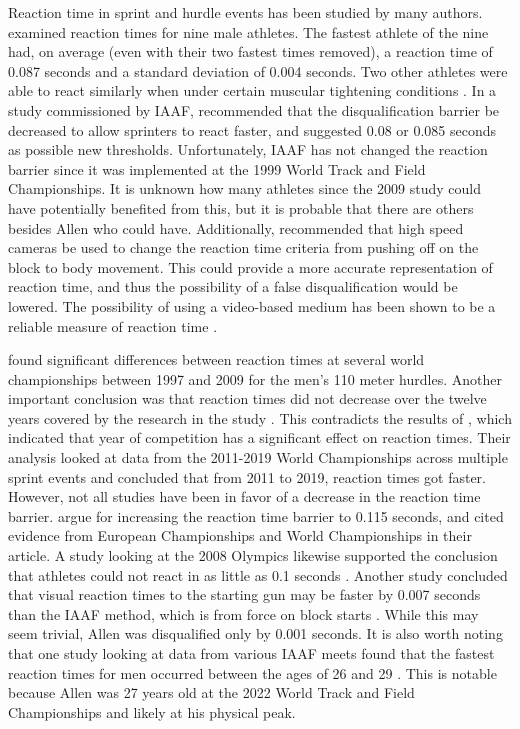 \documentclass[12pt, letterpaper, titlepage]{article}
\begin{document}
Reaction time in sprint and hurdle events has been studied by many authors.
\citet{pain2007sprint} examined reaction times for nine male athletes.  The
fastest athlete of the nine had, on average (even with their two fastest times 
removed), a reaction time of 0.087 seconds and a standard deviation of 0.004
seconds.  Two other athletes were able to react similarly when under certain
muscular tightening conditions \citep{pain2007sprint}. 
In a study commissioned by IAAF,
\citet{komi2009iaaf} recommended that the disqualification 
barrier be decreased to allow sprinters to
react faster, and suggested 0.08 or 0.085 seconds as possible new thresholds.
Unfortunately, IAAF has not changed the reaction barrier since it was
implemented at the 1999 World Track and Field Championships.
It is unknown how many athletes since the 2009 study could have potentially
benefited from this, but it is probable that there are others besides Allen who
could have. Additionally,
\citet{komi2009iaaf} recommended that high speed cameras be used to
change the reaction time criteria from pushing off on the block to body
movement. This could provide a more accurate representation of reaction time, 
and thus the possibility of a false disqualification would be lowered.
The possibility of using a video-based medium has been shown to be a reliable
measure of reaction time \citep{mudric2015evaluation}.


\citet{pilianidis2012start} found
significant differences between reaction times at several world championships
between 1997 and 2009 for the men's 110 meter hurdles.  Another important
conclusion was that reaction times did not decrease over the twelve years
covered by the research in the study \citep{pilianidis2012start}. This 
contradicts the results of \citet{zhang2021correlation}, which indicated that 
year of competition has a significant effect on reaction times.  Their
analysis looked at data from the 2011-2019 World Championships across multiple
sprint events and concluded that from 2011 to 2019, reaction times got
faster. However, not all studies have been in favor of a decrease in the
reaction time barrier. \citet*{brosnan2017effects} argue for increasing 
the reaction time barrier to 0.115 seconds, and cited evidence from European 
Championships and World Championships in their article.  A study looking 
at the 2008 Olympics likewise supported the conclusion that athletes could not
react in as little as 0.1 seconds \citep{lipps2011implications}.  Another study
concluded that visual reaction times to the starting gun may be faster by 0.007
seconds than the IAAF method, which is from force on block starts 
\citep{holmes2018method}.  While this may seem trivial, Allen was disqualified
only by 0.001 seconds. It is also worth noting that one study looking at data 
from various IAAF meets found that the fastest reaction times for men occurred 
between the ages of 26 and 29 \citep{tonnessen2013reaction}.  This is notable 
because Allen was 27 years old at the 2022 World Track and Field Championships 
and likely at his physical peak.
\end{document}

